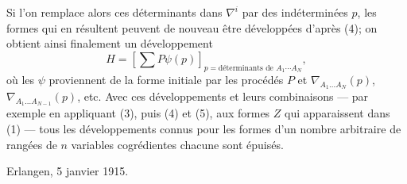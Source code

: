 Si l'on remplace alors ces déterminants dans $\nabla^i$ par des indéterminées $p$, les formes qui en résultent peuvent de nouveau être développées d'après (4); on obtient ainsi finalement un développement
\begin{equation}
  H=\left[\sum P\psi(p)\right]_{p=\text{déterminants de }A_1\cdots A_N},
\tag{5}
\end{equation}
où les $\psi$ proviennent de la forme initiale par les procédés $P$ et $\nabla_{A_1\ldots A_N}(p)$, $\nabla_{A_1\ldots A_{N-1}}(p)$, etc. Avec ces développements et leurs combinaisons --- par exemple en appliquant (3), puis (4) et (5), aux formes $Z$ qui apparaissent dans (1) --- tous les développements connus pour les formes d'un nombre arbitraire de rangées de $n$ variables cogrédientes chacune sont épuisés.

Erlangen, 5 janvier 1915.
